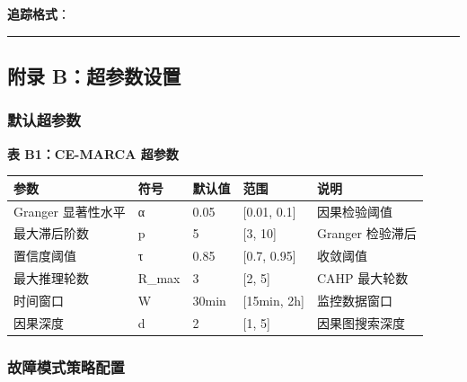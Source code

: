 \textbf{追踪格式}：

\begin{Shaded}
\begin{Highlighting}[]
\FunctionTok{\{}
  \FunctionTok{:} \FunctionTok{,}
  \FunctionTok{:} \OtherTok{[}
    \FunctionTok{\{}
      \FunctionTok{:} \FunctionTok{,}
      \FunctionTok{:} \FunctionTok{,}
      \FunctionTok{:} 
    \FunctionTok{\}}
  \OtherTok{]}
\FunctionTok{\}}
\end{Highlighting}
\end{Shaded}

\begin{center}\rule{0.5\linewidth}{0.5pt}\end{center}

\hypertarget{ux9644ux5f55-bux8d85ux53c2ux6570ux8bbeux7f6e}{%
\subsection{附录
B：超参数设置}\label{ux9644ux5f55-bux8d85ux53c2ux6570ux8bbeux7f6e}}

\hypertarget{ux9ed8ux8ba4ux8d85ux53c2ux6570}{%
\subsubsection{默认超参数}\label{ux9ed8ux8ba4ux8d85ux53c2ux6570}}

\textbf{表 B1：CE-MARCA 超参数}

\begin{longtable}[]{@{}lllll@{}}
\toprule
参数 & 符号 & 默认值 & 范围 & 说明\tabularnewline
\midrule
\endhead
Granger 显著性水平 & α & 0.05 & {[}0.01, 0.1{]} &
因果检验阈值\tabularnewline
最大滞后阶数 & p & 5 & {[}3, 10{]} & Granger 检验滞后\tabularnewline
置信度阈值 & τ & 0.85 & {[}0.7, 0.95{]} & 收敛阈值\tabularnewline
最大推理轮数 & R\_max & 3 & {[}2, 5{]} & CAHP 最大轮数\tabularnewline
时间窗口 & W & 30min & {[}15min, 2h{]} & 监控数据窗口\tabularnewline
因果深度 & d & 2 & {[}1, 5{]} & 因果图搜索深度\tabularnewline
\bottomrule
\end{longtable}

\hypertarget{ux6545ux969cux6a21ux5f0fux7b56ux7565ux914dux7f6e}{%
\subsubsection{故障模式策略配置}\label{ux6545ux969cux6a21ux5f0fux7b56ux7565ux914dux7f6e}}

